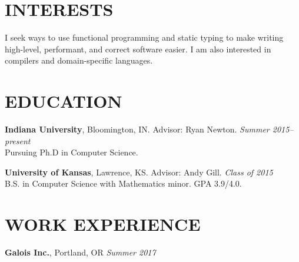 \documentclass{res}
\begin{document}
\address{\texttt{rgscott@indiana.edu} $\bullet$ \texttt{ryanglscott.github.io}}

\begin{resume}

\section{INTERESTS}
    I seek ways to use functional programming and static typing to make writing high-level, performant, and correct software easier. I am also interested in compilers and domain-specific languages.

\section{EDUCATION}
     \textbf{Indiana University}, Bloomington, IN. Advisor: Ryan Newton. \hfill \textit{Summer 2015--present} \\
    Pursuing Ph.D in Computer Science.

     \textbf{University of Kansas}, Lawrence, KS. Advisor: Andy Gill. \hfill \textit{Class of 2015} \\
    B.S. in Computer Science with Mathematics minor. GPA 3.9/4.0.

\section{WORK EXPERIENCE}
    \textbf{Galois Inc.}, Portland, OR \hfill \textit{Summer 2017}


\end{resume}
\end{document}
